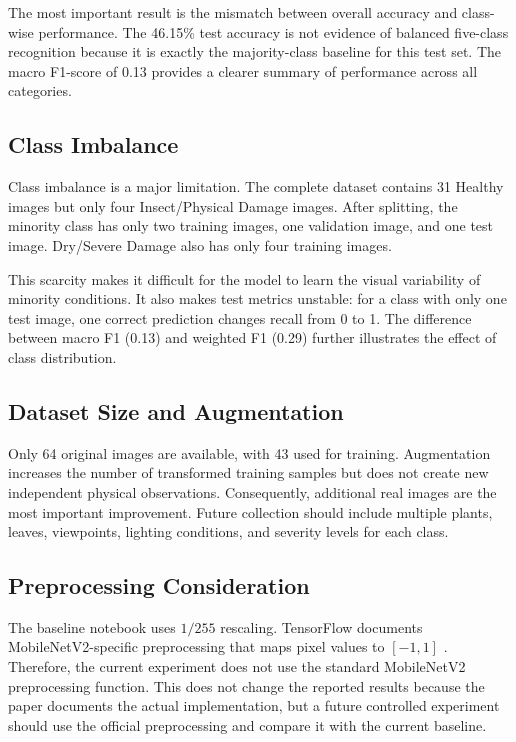\documentclass[conference]{IEEEtran}
\begin{document}
The most important result is the mismatch between overall accuracy and class-wise performance. The 46.15\% test accuracy is not evidence of balanced five-class recognition because it is exactly the majority-class baseline for this test set. The macro F1-score of 0.13 provides a clearer summary of performance across all categories.

\subsection{Class Imbalance}
Class imbalance is a major limitation. The complete dataset contains 31 Healthy images but only four Insect/Physical Damage images. After splitting, the minority class has only two training images, one validation image, and one test image. Dry/Severe Damage also has only four training images.

This scarcity makes it difficult for the model to learn the visual variability of minority conditions. It also makes test metrics unstable: for a class with only one test image, one correct prediction changes recall from 0 to 1. The difference between macro F1 (0.13) and weighted F1 (0.29) further illustrates the effect of class distribution.

\subsection{Dataset Size and Augmentation}
Only 64 original images are available, with 43 used for training. Augmentation increases the number of transformed training samples but does not create new independent physical observations. Consequently, additional real images are the most important improvement. Future collection should include multiple plants, leaves, viewpoints, lighting conditions, and severity levels for each class.

\subsection{Preprocessing Consideration}
The baseline notebook uses $1/255$ rescaling. TensorFlow documents MobileNetV2-specific preprocessing that maps pixel values to $[-1,1]$ \cite{tensorflow_mobilenetv2}. Therefore, the current experiment does not use the standard MobileNetV2 preprocessing function. This does not change the reported results because the paper documents the actual implementation, but a future controlled experiment should use the official preprocessing and compare it with the current baseline.
\end{document}
